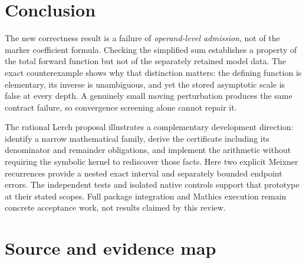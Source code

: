 \documentclass[11pt,a4paper]{article}
\theoremstyle{remark}\newtheorem{remark}[theorem]{Remark}
\begin{document}
\section{Conclusion}

The new correctness result is a failure of \emph{operand-level admission}, not
of the marker coefficient formula. Checking the simplified sum establishes a
property of the total forward function but not of the separately retained model
data. The exact counterexample shows why that distinction matters: the defining
function is elementary, its inverse is unambiguous, and yet the stored asymptotic
scale is false at every depth. A genuinely small moving perturbation produces
the same contract failure, so convergence screening alone cannot repair it.

The rational Lerch proposal illustrates a complementary development direction:
identify a narrow mathematical family, derive the certificate including its
denominator and remainder obligations, and implement the arithmetic without
requiring the symbolic kernel to rediscover those facts. Here two explicit
Meixner recurrences provide a nested exact interval and separately bounded
endpoint errors. The independent tests and isolated native controls support that
prototype at their stated scopes. Full package integration and Mathics execution
remain concrete acceptance work, not results claimed by this review.

\appendix
\section{Source and evidence map}
\end{document}
